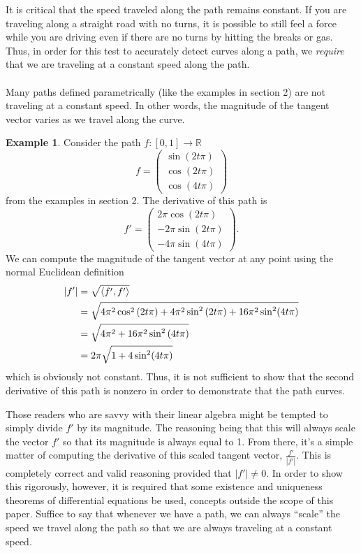\documentclass[]{article}
\newcommand\<{\ensuremath{\left\langle}}
\renewcommand\>{\ensuremath{\right\rangle}}
\newcommand{\RR}{\ensuremath{\mathbb{R}}}
\theoremstyle{definition}
\theoremstyle{definition}
\newtheorem{example}{Example}[section]
\begin{document}
	It is critical that the speed traveled along the path remains constant. If you are traveling along a straight road with no turns, it is possible to still feel a force while you are driving even if there are no turns by hitting the breaks or gas. Thus, in order for this test to accurately detect curves along a path, we \textit{require} that we are traveling at a constant speed along the path.\\
	\\
	Many paths defined parametrically (like the examples in section 2) are not traveling at a constant speed. In other words, the magnitude of the tangent vector varies as we travel along the curve.
	\begin{example}
		Consider the path $f : [0,1] \to \RR$
		$$
			f = \begin{pmatrix}
				\sin(2t\pi)\\
				\cos(2t\pi)\\
				\cos(4t\pi)
			\end{pmatrix}
		$$
		from the examples in section 2. The derivative of this path is
		$$
			f' = \begin{pmatrix}
				2\pi\cos(2t\pi)\\
				-2\pi\sin(2t\pi)\\
				-4\pi\sin(4t\pi)
			\end{pmatrix}.
		$$
		We can compute the magnitude of the tangent vector at any point using the normal Euclidean definition
		\begin{align*}
			|f'| &= \sqrt{\<f',f'\>}\\
			&= \sqrt{4\pi^2\cos^2\left(2t\pi\right) + 4\pi^2\sin^2\left(2t\pi\right) + 16\pi^2\sin^2(4t\pi)}\\
			&= \sqrt{4\pi^2 + 16\pi^2\sin^2\left(4t\pi\right)}\\
			&= 2\pi\sqrt{1 + 4\sin^2(4t\pi)}
		\end{align*}
		which is obviously not constant. Thus, it is not sufficient to show that the second derivative of this path is nonzero in order to demonstrate that the path curves. 
	\end{example}
	Those readers who are savvy with their linear algebra might be tempted to simply divide $f'$ by its magnitude. The reasoning being that this will always scale the vector $f'$ so that its magnitude is always equal to 1. From there, it's a simple matter of computing the derivative of this scaled tangent vector, $\frac{f'}{|f'|}$. This is completely correct and valid reasoning provided that $|f'| \neq 0$. In order to show this rigorously, however, it is required that some existence and uniqueness theorems of differential equations be used, concepts outside the scope of this paper. Suffice to say that whenever we have a path, we can always ``scale'' the speed we travel along the path so that we are always traveling at a constant speed. 
\end{document}
